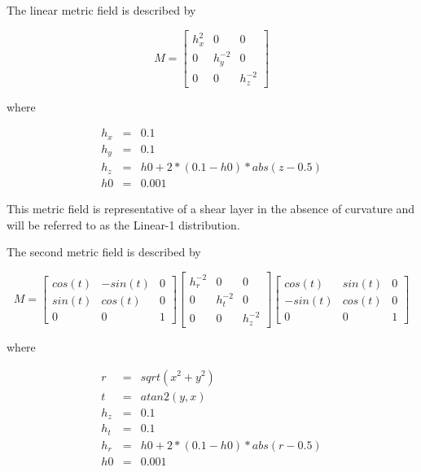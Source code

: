 \documentclass[3p,times,procedia,number]{elsarticle}
\begin{document}
The linear metric field is described by

\begin{equation}
\label{eq:Linear1}
M = \begin{bmatrix}
h_x^2 & 0 & 0 \\
0 & h_y^{-2} & 0 \\
0 & 0 & h_z^{-2} 
\end{bmatrix}
\end{equation}

where

\begin{eqnarray}
h_x &=& 0.1 \nonumber \\
h_y &=& 0.1 \nonumber \\
h_z &=& h0 + 2*(0.1-h0)*abs(z-0.5) \nonumber \\
h0 &=& 0.001 \nonumber
\end{eqnarray}

This metric field is representative of a shear layer in the absence of curvature and will be referred to as the Linear-1 distribution.  

The second metric field is described by 

\begin{equation}
M = 
\begin{bmatrix}
cos(t) & -sin(t) & 0 \\ 
sin(t) & cos(t) &  0 \\ 
0   &    0   &  1 
\end {bmatrix}
\begin{bmatrix}
h_r^{-2} &  0  &    0   \\ 
0 &   h_t^{-2} &  0  \\  
0 &   0  &  h_z^{-2} 
\end {bmatrix}
\begin{bmatrix}
cos(t) & sin(t) &  0  \\
-sin(t) & cos(t) &  0  \\
0  &     0  &    1
\end {bmatrix}
\end{equation}

where

\begin{eqnarray}
r &=& sqrt(x^2+y^2) \nonumber \\
t &=& atan2(y,x) \nonumber \\
h_z &=& 0.1 \nonumber \\
h_t &=& 0.1 \nonumber \\
h_r &=& h0 + 2*(0.1-h0)*abs(r-0.5) \nonumber \\
h0 &=& 0.001 \nonumber
\end{eqnarray}
\end{document}
